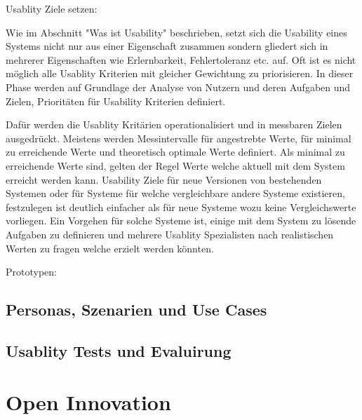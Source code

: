 Usablity Ziele setzen: 

Wie im Abschnitt "Was ist Usability" beschrieben, setzt sich die Usability eines Systems nicht nur aus einer Eigenschaft zusammen sondern gliedert sich in mehrerer Eigenschaften wie Erlernbarkeit, Fehlertoleranz etc. auf. 
Oft ist es nicht möglich alle Usablity Kriterien mit gleicher Gewichtung zu priorisieren. In dieser Phase werden auf Grundlage der Analyse von Nutzern und deren Aufgaben und Zielen, Prioritäten für Usability Kriterien definiert. 

Dafür werden die Usablity Kritärien operationalisiert und in messbaren Zielen ausgedrückt. Meistens werden Messintervalle für angestrebte Werte, für minimal zu erreichende Werte und theoretisch optimale Werte definiert. 
Als minimal zu erreichende Werte sind, gelten der Regel Werte welche aktuell mit dem System erreicht werden kann. Usability Ziele für neue Versionen von bestehenden Systemen oder für Systeme für welche vergleichbare andere 
Systeme existieren, festzulegen ist deutlich einfacher als für neue Systeme wozu keine Vergleichswerte vorliegen. Ein Vorgehen für solche Systeme ist, einige mit dem System zu lösende Aufgaben zu definieren und mehrere Usablity Spezialisten nach realistischen Werten zu fragen welche erzielt werden könnten.

Prototypen:





\subsection{Personas, Szenarien und Use Cases}




\subsection{Usablity Tests und Evaluirung}

\section{Open Innovation}




